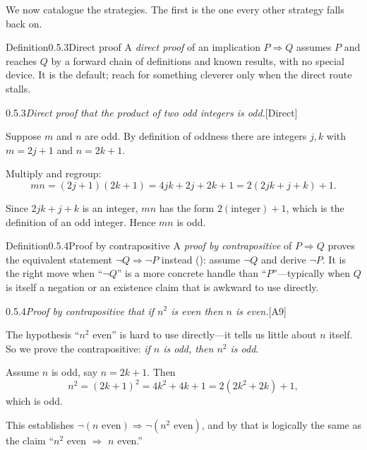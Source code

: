\documentclass[main.tex]{subfiles}
\begin{document}
\noindent We now catalogue the strategies. The first is the one every other strategy falls back on.

\begin{Obj}{Definition}{0.5.3}{Direct proof}
A \emph{direct proof} of an implication $P\Rightarrow Q$ assumes $P$ and reaches $Q$ by a forward
chain of definitions and known results, with no special device. It is the default; reach for
something cleverer only when the direct route stalls.
\end{Obj}

\begin{Prf}{0.5.3}{\itshape Direct proof that the product of two odd integers is odd.}{[Direct]}
\item Suppose $m$ and $n$ are odd. By definition of oddness there are integers $j,k$ with
$m=2j+1$ and $n=2k+1$.
\item Multiply and regroup:
\[
mn=(2j+1)(2k+1)=4jk+2j+2k+1=2(2jk+j+k)+1.
\]
\item Since $2jk+j+k$ is an integer, $mn$ has the form $2(\text{integer})+1$, which is the definition
of an odd integer. Hence $mn$ is odd.
\end{Prf}

\begin{Obj}{Definition}{0.5.4}{Proof by contrapositive}
A \emph{proof by contrapositive} of $P\Rightarrow Q$ proves the equivalent statement
$\neg Q\Rightarrow\neg P$ instead (): assume $\neg Q$ and derive $\neg P$. It is the right
move when ``$\neg Q$'' is a more concrete handle than ``$P$''---typically when $Q$ is itself a
negation or an existence claim that is awkward to use directly.
\end{Obj}

\begin{Prf}{0.5.4}{\itshape Proof by contrapositive that if $n^2$ is even then $n$ is even.}{[A9]}
\item The hypothesis ``$n^2$ even'' is hard to use directly---it tells us little about $n$ itself. So
we prove the contrapositive: \emph{if $n$ is odd, then $n^2$ is odd}.
\item Assume $n$ is odd, say $n=2k+1$. Then
\[
n^2=(2k+1)^2=4k^2+4k+1=2(2k^2+2k)+1,
\]
which is odd.
\item This establishes $\neg(\text{$n$ even})\Rightarrow\neg(\text{$n^2$ even})$, and by
 that is logically the same as the claim ``$n^2$ even $\Rightarrow$ $n$ even.''
\end{Prf}
\end{document}
